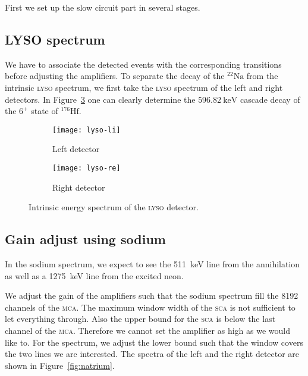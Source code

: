 \documentclass[11pt, english, fleqn, DIV=15, headinclude, BCOR=2cm]{scrreprt}
\begin{document}
First we set up the slow circuit part in several stages.

\subsection{LYSO spectrum}

We have to associate the detected events with the corresponding transitions
before adjusting the amplifiers. To separate the decay of the
${}^{22}\text{Na}$ from the intrinsic \textsc{lyso} spectrum, we first take the
\textsc{lyso} spectrum of the left and right detectors. In
Figure~\ref{fig:lyso} one can clearly determine the
$\SI{596.82}{\kilo\electronvolt}$ cascade decay of the $6^+$ state of
${}^{176}\text{Hf}$.

\begin{figure}
        \centering
        \begin{subfigure}[c]{.49\linewidth}
                \centering
                \texttt{[image: lyso-li]}
                \caption{%
                        Left detector
                }
                \label{fig:lyso-li}
        \end{subfigure}
        \hfill
        \begin{subfigure}[c]{.49\linewidth}
                \centering
                \texttt{[image: lyso-re]}
                \caption{%
                        Right detector
                }
                \label{fig:lyso-re}
        \end{subfigure}
        \caption{%
                Intrinsic energy spectrum of the \textsc{lyso} detector.
        }
        \label{fig:lyso}
\end{figure}

\subsection{Gain adjust using sodium}

In the sodium spectrum, we expect to see the \SI{511}{\kilo\electronvolt} line
from the annihilation as well as a \SI{1275}{\kilo\electronvolt} line from the
excited neon.

We adjust the gain of the amplifiers such that the sodium spectrum fill the
8192 channels of the \textsc{mca}. The maximum window width of the \textsc{sca}
is not sufficient to let everything through. Also the upper bound for the
\textsc{sca} is below the last channel of the \textsc{mca}. Therefore we cannot
set the amplifier as high as we would like to. For the spectrum, we adjust the
lower bound such that the window covers the two lines we are interested. The
spectra of the left and the right detector are shown in
Figure~\ref{fig:natrium}.
\end{document}
